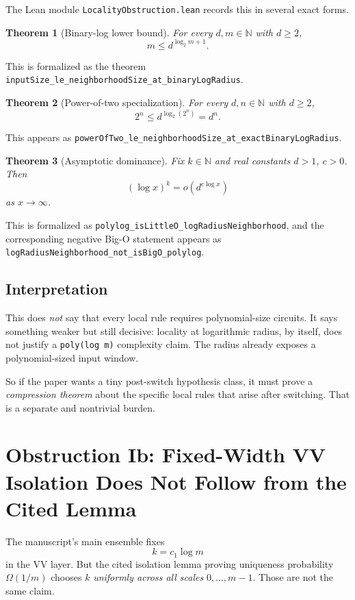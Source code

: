 \documentclass[11pt]{article}
\newtheorem{theorem}{Theorem}[section]
\theoremstyle{remark}
\begin{document}
The Lean module \texttt{LocalityObstruction.lean} records this in several exact forms.

\begin{theorem}[Binary-log lower bound]
For every $d,m \in \mathbb{N}$ with $d \ge 2$,
\[
  m \le d^{\log_2 m + 1}.
\]
\end{theorem}

\noindent
This is formalized as the theorem
\texttt{inputSize\_le\_neighborhoodSize\_at\_binaryLogRadius}.

\begin{theorem}[Power-of-two specialization]
For every $d,n \in \mathbb{N}$ with $d \ge 2$,
\[
  2^n \le d^{\log_2(2^n)} = d^n.
\]
\end{theorem}

\noindent
This appears as
\texttt{powerOfTwo\_le\_neighborhoodSize\_at\_exactBinaryLogRadius}.

\begin{theorem}[Asymptotic dominance]
Fix $k \in \mathbb{N}$ and real constants $d>1$, $c>0$.  Then
\[
  (\log x)^k = o\!\left(d^{c \log x}\right)
\]
as $x \to \infty$.
\end{theorem}

\noindent
This is formalized as
\texttt{polylog\_isLittleO\_logRadiusNeighborhood}, and the corresponding negative
Big-O statement appears as
\texttt{logRadiusNeighborhood\_not\_isBigO\_polylog}.

\subsection{Interpretation}

This does \emph{not} say that every local rule requires polynomial-size circuits.
It says something weaker but still decisive: locality at logarithmic radius, by itself, does not
justify a \texttt{poly(log m)} complexity claim.  The radius already exposes a polynomial-sized
input window.

So if the paper wants a tiny post-switch hypothesis class, it must prove a \emph{compression
theorem} about the specific local rules that arise after switching.  That is a separate and
nontrivial burden.

\section{Obstruction Ib: Fixed-Width VV Isolation Does Not Follow from the Cited Lemma}

The manuscript's main ensemble fixes
\[
  k=c_1\log m
\]
in the VV layer.  But the cited isolation lemma proving uniqueness probability \(\Omega(1/m)\)
chooses \(k\) \emph{uniformly across all scales} \(0,\dots,m-1\).  Those are not the same claim.
\end{document}
